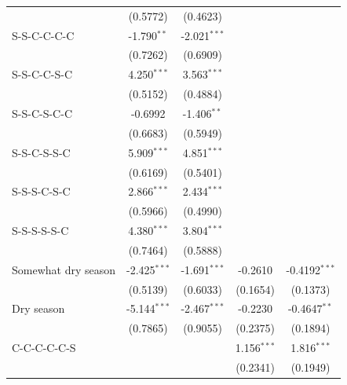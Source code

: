 \begin{table}[htbp]
\begin{tabular}{lcccc}
                                      & (0.5772)       & (0.4623)       &                &   \\   
      S-S-C-C-C-C                     & -1.790$^{**}$  & -2.021$^{***}$ &                &   \\   
                                      & (0.7262)       & (0.6909)       &                &   \\   
      S-S-C-C-S-C                     & 4.250$^{***}$  & 3.563$^{***}$  &                &   \\   
                                      & (0.5152)       & (0.4884)       &                &   \\   
      S-S-C-S-C-C                     & -0.6992        & -1.406$^{**}$  &                &   \\   
                                      & (0.6683)       & (0.5949)       &                &   \\   
      S-S-C-S-S-C                     & 5.909$^{***}$  & 4.851$^{***}$  &                &   \\   
                                      & (0.6169)       & (0.5401)       &                &   \\   
      S-S-S-C-S-C                     & 2.866$^{***}$  & 2.434$^{***}$  &                &   \\   
                                      & (0.5966)       & (0.4990)       &                &   \\   
      S-S-S-S-S-C                     & 4.380$^{***}$  & 3.804$^{***}$  &                &   \\   
                                      & (0.7464)       & (0.5888)       &                &   \\   
      Somewhat dry season             & -2.425$^{***}$ & -1.691$^{***}$ & -0.2610        & -0.4192$^{***}$\\   
                                      & (0.5139)       & (0.6033)       & (0.1654)       & (0.1373)\\   
      Dry season                      & -5.144$^{***}$ & -2.467$^{***}$ & -0.2230        & -0.4647$^{**}$\\   
                                      & (0.7865)       & (0.9055)       & (0.2375)       & (0.1894)\\   
      C-C-C-C-C-S                     &                &                & 1.156$^{***}$  & 1.816$^{***}$\\   
                                      &                &                & (0.2341)       & (0.1949)\\   

\end{tabular}
\end{table}

